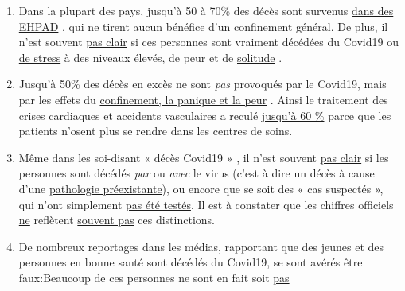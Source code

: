 \begin{enumerate}
\item
  Dans la plupart des pays, jusqu'à 50 à 70\% des décès sont survenus
  \href{https://ltccovid.org/2020/04/12/mortality-associated-with-covid-19-outbreaks-in-care-homes-early-international-evidence/}{dans
  des EHPAD} , qui ne tirent aucun bénéfice d'un confinement général. De
  plus, il n'est souvent
  \href{https://www.hsj.co.uk/commissioning/thousands-of-extra-deaths-outside-hospital-not-attributed-to-covid-19/7027459.article}{pas
  clair} si ces personnes sont vraiment décédées du Covid19 ou
  \href{https://www.nytimes.com/2020/04/16/world/canada/montreal-nursing-homes-coronavirus.html}{de
  stress} à des niveaux élevés, de peur et de
  \href{http://pflegeethik-initiative.de/2020/04/15/corona-krise-falsche-prioritaeten-gesetzt-und-ethische-prinzipien-verletzt/}{solitude}
  .
\item
  Jusqu'à 50\% des décès en excès ne sont \emph{pas} provoqués par le
  Covid19, mais par les effets du
  \href{https://www.telegraph.co.uk/global-health/science-and-disease/two-new-waves-deaths-break-nhs-new-analysis-warns/}{confinement,
  la panique et la peur} . Ainsi le traitement des crises cardiaques et
  accidents vasculaires a reculé
  \href{https://www.nytimes.com/2020/04/06/well/live/coronavirus-doctors-hospitals-emergency-care-heart-attack-stroke.html}{jusqu'à
  60 \%} parce que les patients n'osent plus se rendre dans les centres
  de soins.
\item
  Même dans les soi-disant « décès Covid19 » , il n'est souvent
  \href{https://spectator.us/understand-report-figures-covid-deaths/}{pas
  clair} si les personnes sont décédés \emph{par} ou \emph{avec} le
  virus (c'est à dire un décès à cause d'une
  \href{https://spectator.us/understand-report-figures-covid-deaths/}{pathologie
  préexistante}), ou encore que se soit des « cas suspectés », qui n'ont
  simplement \href{https://www.youtube.com/watch?v=V0lIWZpiRU0}{pas été
  testés}. Il est à constater que les chiffres officiels
  \href{https://www.hsj.co.uk/coronavirus/systematic-reviews-to-discover-true-cause-of-outbreak-deaths/7027491.article}{ne}
  reflètent
  \href{https://www.hsj.co.uk/coronavirus/systematic-reviews-to-discover-true-cause-of-outbreak-deaths/7027491.article}{souvent
  pas} ces distinctions.
\item
  De nombreux reportages dans les médias, rapportant que des jeunes et
  des personnes en bonne santé sont décédés du Covid19, se sont avérés
  être faux:Beaucoup de ces personnes ne sont en fait soit
  \href{https://www.dailymail.co.uk/news/article-8193487/Coroner-refuses-rule-COVID-19-cause-death-six-week-old-Connecticut-baby.html}{pas
}
\end{enumerate}
